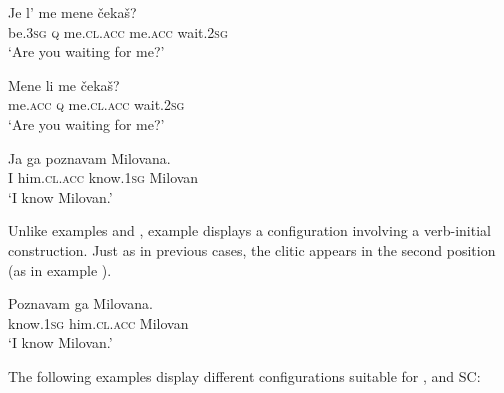 \documentclass[output=paper,
colorlinks,
citecolor=brown,
newtxmath
]{langscibook}
\begin{document}

\ea\label{ex:zivojinovic:28}
\gll Je l’  me         mene    čekaš?\\
     be.\textsc{3sg} \textsc{q} me.\textsc{cl.acc}  me.\textsc{acc}  wait.\textsc{2sg} \\
\glt `Are you waiting for me?'
\z


\ea\label{ex:zivojinovic:29}
\gll Mene    li  me         čekaš?\\
     me.\textsc{acc}  \textsc{q}   me.\textsc{cl.acc}  wait.\textsc{2sg} \\
\glt `Are you waiting for me?'
\z


\ea\label{ex:zivojinovic:30}
\gll Ja ga         poznavam Milovana.\\
     I  him.\textsc{cl.acc} know.\textsc{1sg}     Milovan \\
\glt `I know Milovan.'
\z

\noindent Unlike examples  and , example  displays a configuration involving a verb-initial construction. Just as in previous cases, the clitic appears in the second position (as in example ).



\ea\label{ex:zivojinovic:31}
\gll Poznavam ga          Milovana.\\
     know.\textsc{1sg}    him.\textsc{cl.acc}  Milovan \\
\glt `I know Milovan.'
\z

\noindent The following  examples display different configurations suitable for ,  and SC:



\z


\z

\end{document}
